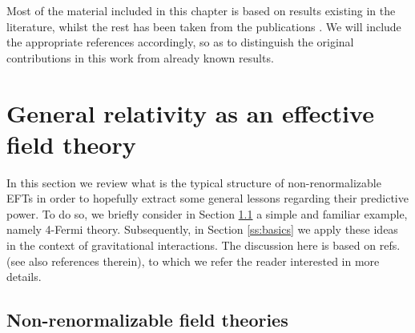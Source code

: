 Most of the material included in this chapter is based on results existing in the literature, whilst the rest has been taken from the publications \cite{Castellano:2022bvr, Castellano:2023aum}. We will include the appropriate references accordingly, so as to distinguish the original contributions in this work from already known results.   

\section{General relativity as an effective field theory}
\label{s:genrelEFT}	

In this section we review what is the typical structure of non-renormalizable EFTs in order to hopefully extract some general lessons regarding their predictive power. To do so, we briefly consider in Section \ref{ss:nonrenormalizableEFTs} a simple and familiar example, namely 4-Fermi theory. Subsequently, in Section \ref{ss:basics} we apply these ideas in the context of gravitational interactions. The discussion here is based on refs. \cite{Burgess:2020tbq,Donoghue:1994dn,Donoghue:2022eay} (see also references therein), to which we refer the reader interested in more details. %

\subsection{Non-renormalizable field theories}
\label{ss:nonrenormalizableEFTs}

